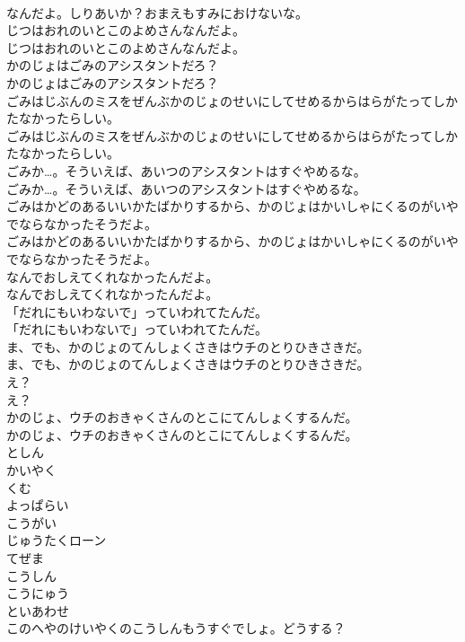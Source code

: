 \documentclass[8pt]{extreport}
\begin{document}
\begin{CJK}{UTF8}{min}
\\	なんだよ。しりあいか？おまえもすみにおけないな。
\\	じつはおれのいとこのよめさんなんだよ。
\\	じつはおれのいとこのよめさんなんだよ。
\\	かのじょはごみのアシスタントだろ？
\\	かのじょはごみのアシスタントだろ？
\\	ごみはじぶんのミスをぜんぶかのじょのせいにしてせめるからはらがたってしかたなかったらしい。
\\	ごみはじぶんのミスをぜんぶかのじょのせいにしてせめるからはらがたってしかたなかったらしい。
\\	ごみか…。そういえば、あいつのアシスタントはすぐやめるな。
\\	ごみか…。そういえば、あいつのアシスタントはすぐやめるな。
\\	ごみはかどのあるいいかたばかりするから、かのじょはかいしゃにくるのがいやでならなかったそうだよ。
\\	ごみはかどのあるいいかたばかりするから、かのじょはかいしゃにくるのがいやでならなかったそうだよ。
\\	なんでおしえてくれなかったんだよ。
\\	なんでおしえてくれなかったんだよ。
\\	「だれにもいわないで」っていわれてたんだ。
\\	「だれにもいわないで」っていわれてたんだ。
\\	ま、でも、かのじょのてんしょくさきはウチのとりひきさきだ。
\\	ま、でも、かのじょのてんしょくさきはウチのとりひきさきだ。
\\	え？
\\	え？
\\	かのじょ、ウチのおきゃくさんのとこにてんしょくするんだ。
\\	かのじょ、ウチのおきゃくさんのとこにてんしょくするんだ。
\\	としん
\\	かいやく
\\	くむ
\\	よっぱらい
\\	こうがい
\\	じゅうたくローン
\\	てぜま
\\	こうしん
\\	こうにゅう
\\	といあわせ
\\	このへやのけいやくのこうしんもうすぐでしょ。どうする？

\end{CJK}
\end{document}
